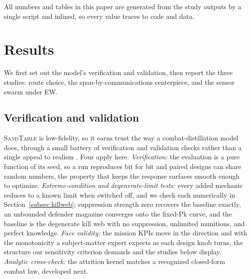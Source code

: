 \documentclass[11pt]{article}
\newcommand{\sandtable}{\textsc{SandTable}}
\begin{document}
All numbers and tables in this paper are generated from the study outputs by a single script and inlined, so every value traces to code and data.

\section{Results}
\label{sec:results}

We first set out the model's verification and validation, then report the three studies: route choice, the span-by-communications centerpiece, and the sensor swarm under EW.

\subsection{Verification and validation}
\label{subsec:validation}

\sandtable{} is low-fidelity, so it earns trust the way a combat-distillation model does, through a small battery of verification and validation checks rather than a single appeal to realism \citep{sargent2013verification}. Four apply here. \emph{Verification:} the evaluation is a pure function of its seed, so a run reproduces bit for bit and paired designs can share random numbers, the property that keeps the response surfaces smooth enough to optimize. \emph{Extreme-condition and degenerate-limit tests:} every added mechanic reduces to a known limit when switched off, and we check each numerically in Section~\ref{subsec:killweb}; suppression strength zero recovers the baseline exactly, an unbounded defender magazine converges onto the fixed-Pk curve, and the baseline is the degenerate kill web with no suppression, unlimited munitions, and perfect knowledge. \emph{Face validity:} the mission KPIs move in the direction and with the monotonicity a subject-matter expert expects as each design knob turns, the structure our sensitivity criterion demands and the studies below display. \emph{Analytic cross-check:} the attrition kernel matches a recognized closed-form combat law, developed next.
\end{document}
